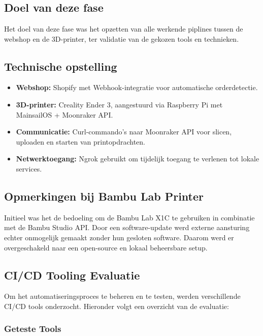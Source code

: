 \chapter{}%
\label{ch:poc}

\section{Doel van deze fase}
Het doel van deze fase was het opzetten van alle werkende piplines tussen de webshop en de 3D-printer, ter validatie van de gekozen tools en technieken.

\section{Technische opstelling}
\begin{itemize}
    \item \textbf{Webshop:} Shopify met Webhook-integratie voor automatische orderdetectie.
    \item \textbf{3D-printer:} Creality Ender 3, aangestuurd via Raspberry Pi met MainsailOS + Moonraker API.
    \item \textbf{Communicatie:} Curl-commando’s naar Moonraker API voor slicen, uploaden en starten van printopdrachten.
    \item \textbf{Netwerktoegang:} Ngrok gebruikt om tijdelijk toegang te verlenen tot lokale services.
\end{itemize}

\section{Opmerkingen bij Bambu Lab Printer}
Initieel was het de bedoeling om de Bambu Lab X1C te gebruiken in combinatie met de Bambu Studio API. Door een software-update werd externe aansturing echter onmogelijk gemaakt zonder hun gesloten software. Daarom werd er overgeschakeld naar een open-source en lokaal beheersbare setup.

\section{CI/CD Tooling Evaluatie}
Om het automatiseringsproces te beheren en te testen, werden verschillende CI/CD tools onderzocht. Hieronder volgt een overzicht van de evaluatie:

\subsection{Geteste Tools}

